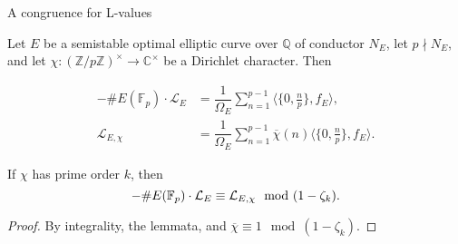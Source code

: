 \documentclass[10pt]{beamer}
\begin{document}
\begin{frame}[t]{A congruence for L-values}

Let $ E $ be a semistable optimal elliptic curve over $ \mathbb{Q} $ of conductor $ N_E $, let $ p \nmid N_E $, and let $ \chi : (\mathbb{Z} / p\mathbb{Z})^\times \to \mathbb{C}^\times $ be a Dirichlet character. \pause Then

\vspace{-0.5cm}

\begin{align*}
-\#E(\mathbb{F}_p) \cdot \mathcal{L}_E & = \dfrac{1}{\Omega_E}\sum_{n = 1}^{p - 1} \langle\{0, \tfrac{n}{p}\}, f_E\rangle, \\
\mathcal{L}_{E, \chi} & = \dfrac{1}{\Omega_E}\sum_{n = 1}^{p - 1} \overline{\chi}(n)\langle\{0, \tfrac{n}{p}\}, f_E\rangle.
\end{align*}

\pause

\begin{corollary}[A]
If $ \chi $ has prime order $ k $, then
\vspace{-0.2cm} $$ \vspace{-0.2cm} -\#E(\mathbb{F}_p) \cdot \mathcal{L}_E \equiv \mathcal{L}_{E, \chi} \mod (1 - \zeta_k). $$
\end{corollary}

\begin{proof}
By integrality, the lemmata, and $ \overline{\chi} \equiv 1 \mod (1 - \zeta_k) $.
\end{proof}

\end{frame}
\end{document}
